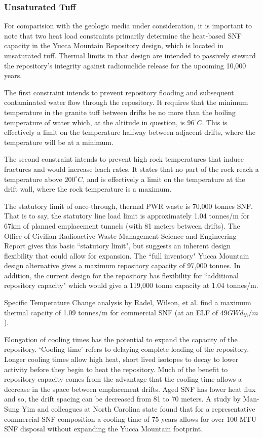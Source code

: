 \subsubsection{Unsaturated Tuff}

For comparision with the geologic media under consideration, it is important to 
note that two heat load constraints primarily determine the heat-based SNF capacity
in the Yucca Mountain Repository design, which is located in unsaturated tuff.
Thermal limits in that design are intended to passively steward the
repository's integrity against radionuclide release for the upcoming 10,000
years.

The first constraint intends to prevent repository flooding and subsequent
contaminated water flow through the repository. It requires that the minimum
temperature in the granite tuff between drifts be no more than the boiling
temperature of water which, at the altitude in question, is $96^{\circ}C$. This
is effectively a limit on the temperature halfway between adjacent drifts,
where the temperature will be at a minimum.

The second constraint intends to prevent high rock temperatures that induce
fractures and would increase leach rates. It states that no part of the rock
reach a temperature above $200^{\circ}C$, and is effectively a limit on the
temperature at the drift wall, where the rock temperature is a maximum.  

The statutory limit of once-through, thermal PWR waste is 70,000 tonnes SNF.
That is to say, the statutory line load limit is approximately 1.04 tonnes/m
for 67km of planned emplacement tunnels (with 81 meters between drifts). The
Office of Civilian Radioactive Waste Management Science and Engineering Report
gives this basic ``statutory limit", but suggests an inherent design
flexibility that could allow for expansion. The ``full inventory" Yucca
Mountain design alternative gives a maximum repository capacity of 97,000
tonnes. In addition, the current design for the repository has flexibility for
``additional repository capacity" which would give a 119,000 tonne capacity at
1.04 tonnes/m.\cite{ doe_yucca_2002}

Specific Temperature Change analysis by Radel, Wilson, et al. find a maximum
thermal capcity of 1.09 tonnes/m for commercial SNF (at an ELF of $49
GWd_{th}/m$).\cite{radel_effect_2007} 

Elongation of cooling times has the potential to expand the capacity of the
repository. `Cooling time' refers to delaying complete loading of the
repository. Longer cooling times allow high heat, short lived isotopes to decay
to lower activity before they begin to heat the repository. Much of the benefit
to repository capacity comes from the advantage that the cooling time allows a
decrease in the space between emplacement drifts. Aged SNF has lower heat flux
and so, the drift spacing can be decreased from 81 to 70 meters. A study by
Man-Sung Yim and colleagues at North Carolina state found that for a
representative commercial SNF composition a cooling time of 75 years allows for
over 100 MTU SNF disposal without expanding the Yucca Mountain
footprint.\cite{li_examining_2007}

